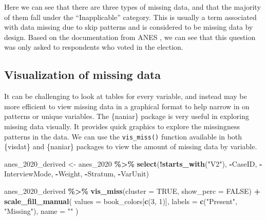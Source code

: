 \documentclass[
]{krantz}
\makeatletter
\newenvironment{Shaded}{\begin{snugshade}}{\end{snugshade}}
\newcommand{\AttributeTok}[1]{\textcolor[rgb]{0.27,0.27,0.27}{#1}}
\newcommand{\ConstantTok}[1]{\textcolor[rgb]{0.37,0.37,0.37}{#1}}
\newcommand{\DecValTok}[1]{\textcolor[rgb]{0.06,0.06,0.06}{#1}}
\newcommand{\FunctionTok}[1]{\textcolor[rgb]{0.27,0.27,0.27}{\textbf{#1}}}
\newcommand{\NormalTok}[1]{#1}
\newcommand{\OtherTok}[1]{\textcolor[rgb]{0.37,0.37,0.37}{#1}}
\newcommand{\SpecialCharTok}[1]{\textcolor[rgb]{0.43,0.43,0.43}{\textbf{#1}}}
\newcommand{\StringTok}[1]{\textcolor[rgb]{0.5,0.5,0.5}{#1}}
\newenvironment{kframe}{%
\medskip{}
\setlength{\fboxsep}{.8em}
 \def\at@end@of@kframe{}%
 \ifinner\ifhmode%
  \def\at@end@of@kframe{\end{minipage}}%
  \begin{minipage}{\columnwidth}%
 \fi\fi%
 \def\FrameCommand##1{\hskip\@totalleftmargin \hskip-\fboxsep
 \colorbox{shadecolor}{##1}\hskip-\fboxsep
     \hskip-\linewidth \hskip-\@totalleftmargin \hskip\columnwidth}%
 \MakeFramed {\advance\hsize-\width
   \@totalleftmargin\z@ \linewidth\hsize
   \@setminipage}}%
 {\par\unskip\endMakeFramed%
 \at@end@of@kframe}
\renewenvironment{Shaded}{\begin{kframe}}{\end{kframe}}
\makeatother
\begin{document}
Here we can see that there are three types of missing data, and that the majority of them fall under the ``Inapplicable'' category. This is usually a term associated with data missing due to skip patterns and is considered to be missing data by design. Based on the documentation from ANES \citep{debell}, we can see that this question was only asked to respondents who voted in the election.

\hypertarget{visualization-of-missing-data}{%
\subsection{Visualization of missing data}\label{visualization-of-missing-data}}

It can be challenging to look at tables for every variable, and instead may be more efficient to view missing data in a graphical format to help narrow in on patterns or unique variables. The \{naniar\} package is very useful in exploring missing data visually. It provides quick graphics to explore the missingness patterns in the data. We can use the \texttt{vis\_miss()} function available in both \{visdat\} and \{naniar\} packages to view the amount of missing data by variable.

\begin{Shaded}
\begin{Highlighting}[]
\NormalTok{anes\_2020\_derived }\OtherTok{\textless{}{-}}\NormalTok{ anes\_2020 }\SpecialCharTok{\%\textgreater{}\%}
  \FunctionTok{select}\NormalTok{(}\SpecialCharTok{!}\FunctionTok{starts\_with}\NormalTok{(}\StringTok{"V2"}\NormalTok{), }\SpecialCharTok{{-}}\NormalTok{CaseID, }\SpecialCharTok{{-}}\NormalTok{InterviewMode, }\SpecialCharTok{{-}}\NormalTok{Weight, }\SpecialCharTok{{-}}\NormalTok{Stratum, }\SpecialCharTok{{-}}\NormalTok{VarUnit)}

\NormalTok{anes\_2020\_derived }\SpecialCharTok{\%\textgreater{}\%}
  \FunctionTok{vis\_miss}\NormalTok{(}\AttributeTok{cluster =} \ConstantTok{TRUE}\NormalTok{, }\AttributeTok{show\_perc =} \ConstantTok{FALSE}\NormalTok{) }\SpecialCharTok{+}
  \FunctionTok{scale\_fill\_manual}\NormalTok{(}
    \AttributeTok{values =}\NormalTok{ book\_colors[}\FunctionTok{c}\NormalTok{(}\DecValTok{3}\NormalTok{, }\DecValTok{1}\NormalTok{)],}
    \AttributeTok{labels =} \FunctionTok{c}\NormalTok{(}\StringTok{"Present"}\NormalTok{, }\StringTok{"Missing"}\NormalTok{),}
    \AttributeTok{name =} \StringTok{""}
\NormalTok{  )}
\end{Highlighting}
\end{Shaded}
\end{document}
